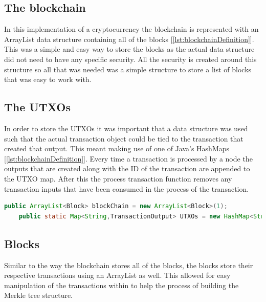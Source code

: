 \documentclass{l4proj}
\begin{document}
\subsection{The blockchain}
In this implementation of a cryptocurrency the blockchain is represented with an ArrayList data structure containing
all of the blocks [\ref{lst:blockchainDefinition}]. This was a simple and easy way to store the blocks as the actual data structure did not need to
have any specific security. All the security is created around this structure so all that was needed was a simple 
structure to store a list of blocks that was easy to work with. 



\subsection{The UTXOs}
In order to store the UTXOs it was important that a data structure was used such that the actual transaction
object could be tied to the transaction that created that output. This meant making use of one of Java's HashMaps
[\ref{lst:blockchainDefinition}]. Every time a transaction is processed by a node the outputs that are created 
along with the ID of the transaction are appended to the UTXO map. After this the process transaction function 
removes any transaction inputs that have been consumed in the process of the transaction.

\begin{lstlisting}[language=java, float, caption={This figure shows the definitions for the blockchain and also 
    the UTXO maps. The blockchain is an ArrayList created with one starting block acting as a genesis block. The 
    UTXO map is a HashMap mapping the transaction id to the transaction output created from each transaction.},
    label=lst:blockchainDefinition]
    public ArrayList<Block> blockChain = new ArrayList<Block>(1);
    public static Map<String,TransactionOutput> UTXOs = new HashMap<String,TransactionOutput>();
\end{lstlisting}

\subsection{Blocks}
Similar to the way the blockchain stores all of the blocks, the blocks store their respective transactions 
using an ArrayList as well. This allowed for easy manipulation of the transactions within to help the process of
building the Merkle tree structure.
\end{document}
